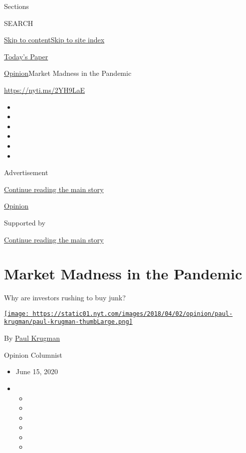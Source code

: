 Sections

SEARCH

\protect\hyperlink{site-content}{Skip to
content}\protect\hyperlink{site-index}{Skip to site index}

\href{https://myaccount.nytimes.com/auth/login?response_type=cookie\&client_id=vi}{}

\href{https://www.nytimes.com/section/todayspaper}{Today's Paper}

\href{/section/opinion}{Opinion}\textbar{}Market Madness in the Pandemic

\href{https://nyti.ms/2YH9LaE}{https://nyti.ms/2YH9LaE}

\begin{itemize}
\item
\item
\item
\item
\item
\item
\end{itemize}

Advertisement

\protect\hyperlink{after-top}{Continue reading the main story}

\href{/section/opinion}{Opinion}

Supported by

\protect\hyperlink{after-sponsor}{Continue reading the main story}

\hypertarget{market-madness-in-the-pandemic}{%
\section{Market Madness in the
Pandemic}\label{market-madness-in-the-pandemic}}

Why are investors rushing to buy junk?

\href{https://www.nytimes.com/by/paul-krugman}{\texttt{[image: https://static01.nyt.com/images/2018/04/02/opinion/paul-krugman/paul-krugman-thumbLarge.png]}}

By \href{https://www.nytimes.com/by/paul-krugman}{Paul Krugman}

Opinion Columnist

\begin{itemize}
\item
  June 15, 2020
\item
  \begin{itemize}
  \item
  \item
  \item
  \item
  \item
  \item
  \end{itemize}
\end{itemize}

